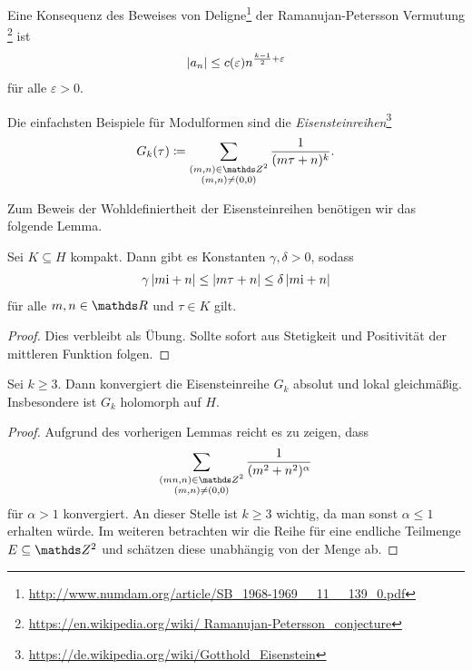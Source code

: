 \begin{bem}
Eine Konsequenz des Beweises von Deligne\footnote{\url{http://www.numdam.org/article/SB_1968-1969__11__139_0.pdf}} der Ramanujan-Petersson Vermutung \footnote{\url{https://en.wikipedia.org/wiki/
Ramanujan-Petersson_conjecture}}
ist
\begin{align*}
\left\vert a_n\right\vert \leq c(\varepsilon) n^{\frac{k-1}{2}+\varepsilon}
\end{align*}
für alle $\varepsilon>0$.
\end{bem}

\begin{defi}
Die einfachsten Beispiele für Modulformen sind die \emph{Eisensteinreihen}\footnote{\url{https://de.wikipedia.org/wiki/Gotthold_Eisenstein}}
\begin{align*}
G_k(\tau)\coloneqq \sum_{\substack{(m,n)\in \Z^2\\ (m,n)\not = (0,0)}} \frac{1}{(m\tau +n )^k}.
\end{align*}
\end{defi}

Zum Beweis der Wohldefiniertheit der Eisensteinreihen benötigen wir
das folgende Lemma.

\begin{lem}
Sei $K\subseteq H$ kompakt.
Dann gibt es Konstanten $\gamma,\delta>0$, sodass
\begin{align*}
\gamma \left\vert m\mathrm{i}+n\right\vert \leq \left\vert m\tau +n\right\vert \leq \delta \left\vert m\mathrm{i}+n\right\vert
\end{align*}
für alle $m,n \in \R$ und $\tau \in K$ gilt.
\end{lem}
\begin{proof}
Dies verbleibt als Übung.
Sollte sofort aus Stetigkeit und Positivität der mittleren Funktion folgen.
\end{proof}

\begin{thm}
Sei $k\geq 3$. Dann konvergiert die Eisensteinreihe $G_k$
absolut und lokal gleichmäßig.
Insbesondere ist $G_k$ holomorph auf $H$.
\end{thm}
\begin{proof}
Aufgrund des vorherigen Lemmas reicht es zu zeigen, dass
\begin{align*}
\sum_{\substack{(mn,n)\in \Z^2\\ (m,n)\not =(0,0)}} \frac{1}{(m^2+n^2)^\alpha}
\end{align*}
für $\alpha>1$ konvergiert. An dieser Stelle ist $k\geq 3$ wichtig,
da man sonst $\alpha\leq 1$ erhalten würde.
Im weiteren betrachten wir die Reihe für eine endliche Teilmenge $E \subseteq \Z^2$ und schätzen diese unabhängig von der Menge ab.
\end{proof}

